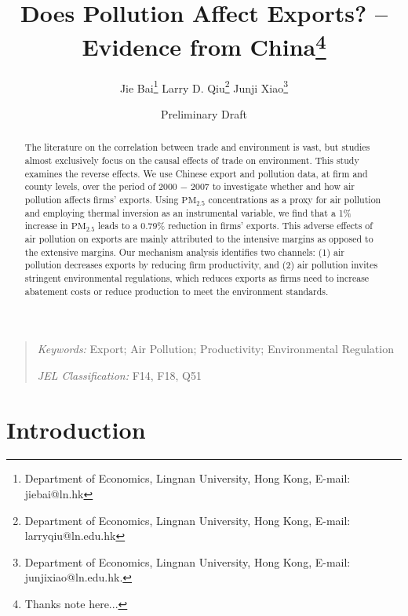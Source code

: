 \documentclass[12pt]{article}
\begin{document}
\title{Does Pollution Affect Exports? -- Evidence from China\thanks{%
Thanks note here...}}
\author{Jie Bai\thanks{%
Department of Economics, Lingnan University, Hong Kong, E-mail: jiebai@ln.hk}
\quad Larry D. Qiu\thanks{%
Department of Economics, Lingnan University, Hong Kong, E-mail:
larryqiu@ln.edu.hk} \quad Junji Xiao\thanks{%
Department of Economics, Lingnan University, Hong Kong, E-mail:
junjixiao@ln.edu.hk.}}
\date{Preliminary Draft}

\maketitle

\begin{abstract}
The literature on the correlation between trade and environment is vast, but
studies almost exclusively focus on the causal effects of trade on
environment. This study examines the reverse effects. We use Chinese export
and pollution data, at firm and county levels, over the period of 2000 $-$ 2007
to investigate whether and how air pollution affects firms' exports. Using $%
\mathrm{PM_{2.5}}$ concentrations as a proxy for air pollution and employing
thermal inversion as an instrumental variable, we find that a 1\% increase
in $\mathrm{PM_{2.5}}$ leads to a 0.79\% reduction in firms' exports. This
adverse effects of air pollution on exports are mainly attributed to the
intensive margins as opposed to the extensive margins. Our mechanism
analysis identifies two channels: (1) air pollution decreases exports by
reducing firm productivity, and (2) air pollution invites stringent
environmental regulations, which reduces exports as firms need to increase
abatement costs or reduce production to meet the environment standards.
\end{abstract}

\begin{quote}
\emph{Keywords:} Export; Air Pollution; Productivity; Environmental 
Regulation 

\emph{JEL Classification:} F14, F18, Q51 
\end{quote}

\newpage  \setcounter{page}{1} 

\section{Introduction}
\end{document}
